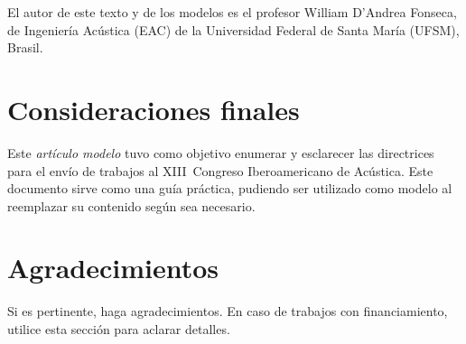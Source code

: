 El autor de este texto y de los modelos es el profesor William D'Andrea Fonseca, de Ingeniería Acústica (EAC) de la Universidad Federal de Santa María (UFSM), Brasil.

\section{Consideraciones finales}

Este \textit{artículo modelo} tuvo como objetivo enumerar y esclarecer las directrices para el envío de trabajos al XIII~Congreso Iberoamericano de Acústica. Este documento sirve como una guía práctica, pudiendo ser utilizado como modelo al reemplazar su contenido según sea necesario.


\section{Agradecimientos}

Si es pertinente, haga agradecimientos.
%
En caso de trabajos con financiamiento, utilice esta sección para aclarar detalles.


